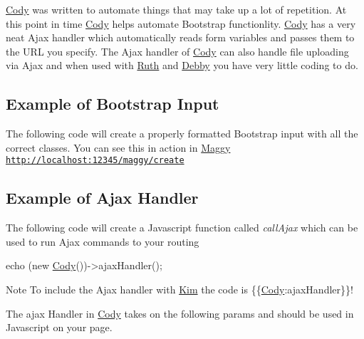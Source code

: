 \hyperlink{classCody}{Cody} was written to automate things that may take up a lot of repetition. At this point in time \hyperlink{classCody}{Cody} helps automate Bootstrap functionlity. \hyperlink{classCody}{Cody} has a very neat Ajax handler which automatically reads form variables and passes them to the U\+R\+L you specify. The Ajax handler of \hyperlink{classCody}{Cody} can also handle file uploading via Ajax and when used with \hyperlink{classRuth}{Ruth} and \hyperlink{classDebby}{Debby} you have very little coding to do.\hypertarget{index_cody_example}{}\subsection{Example of Bootstrap Input}\label{index_cody_example}
The following code will create a properly formatted Bootstrap input with all the correct classes. You can see this in action in \hyperlink{classMaggy}{Maggy} \href{http://localhost:12345/maggy/create}{\tt http\+://localhost\+:12345/maggy/create} 
\hypertarget{index_code_example_ajax}{}\subsection{Example of Ajax Handler}\label{index_code_example_ajax}
The following code will create a Javascript function called {\itshape call\+Ajax} which can be used to run Ajax commands to your routing 
\begin{DoxyCode}
echo (\textcolor{keyword}{new} \hyperlink{classCody}{Cody}())->ajaxHandler();
\end{DoxyCode}


\begin{DoxyNote}{Note}
To include the Ajax handler with \hyperlink{classKim}{Kim} the code is \{\{\hyperlink{classCody}{Cody}\+:ajax\+Handler\}\}!
\end{DoxyNote}
The ajax Handler in \hyperlink{classCody}{Cody} takes on the following params and should be used in Javascript on your page.


